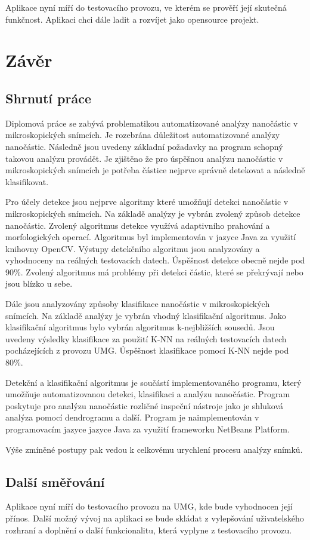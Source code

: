 \documentclass[11pt,twoside,a4paper,table]{book}
\begin{document}
Aplikace nyní míří do testovacího provozu, ve kterém se prověří její skutečná funkčnost. Aplikaci chci dále ladit a rozvíjet jako opensource projekt.

\chapter{Závěr}
\section{Shrnutí práce}
Diplomová práce se zabývá problematikou automatizované analýzy nanočástic v mikroskopických snímcích. Je rozebrána důležitost automatizované analýzy nanočástic. Následně jsou uvedeny základní požadavky na program schopný takovou analýzu provádět. Je zjištěno že pro úspěšnou analýzu nanočástic v mikroskopických snímcích je potřeba částice nejprve správně detekovat a následně klasifikovat.

Pro účely detekce jsou nejprve algoritmy které umožňují detekci nanočástic v mikroskopických snímcích. Na základě analýzy je vybrán zvolený způsob detekce nanočástic. Zvolený algoritmus detekce využívá adaptivního prahování a morfologických operací. Algoritmus byl implementován v jazyce Java za využití knihovny OpenCV. Výstupy detekčního algoritmu jsou analyzovány a vyhodnoceny na reálných testovacích datech. Úspěšnost detekce obecně nejde pod 90\%. Zvolený algoritmus má problémy při detekci částic, které se překrývají nebo jsou blízko u sebe.

Dále jsou analyzovány způsoby klasifikace nanočástic v mikroskopických snímcích. Na základě analýzy je vybrán vhodný klasifikační algoritmus. Jako klasifikační algoritmus bylo vybrán algoritmus k-nejbližších sousedů. Jsou uvedeny výsledky klasifikace za použití K-NN na reálných testovacích datech pocházejících z provozu UMG. Úspěšnost klasifikace pomocí K-NN nejde pod 80\%.

Detekční a klasifikační algoritmus je součástí implementovaného programu, který umožňuje automatizovanou detekci, klasifikaci a analýzu nanočástic. Program poskytuje pro analýzu nanočástic rozličné inspeční nástroje jako je shluková analýza pomocí dendrogramu a další. Program je naimplementován v programovacím jazyce jazyce Java za využití frameworku NetBeans Platform.

Výše zmíněné postupy pak vedou k celkovému urychlení procesu analýzy snímků.

\section{Další směřování}
Aplikace nyní míří do testovacího provozu na UMG, kde bude vyhodnocen její přínos. Další možný vývoj na aplikaci se bude skládat z vylepšování uživatelského rozhraní a doplnění o další funkcionalitu, která vyplyne z testovacího provozu.
\end{document}
